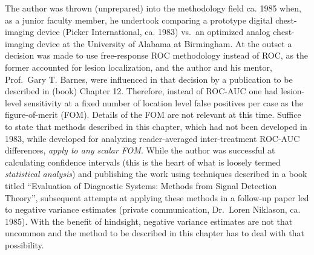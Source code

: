 \documentclass[
]{book}
\begin{document}
The author was thrown (unprepared) into the methodology field ca. 1985 when, as a junior faculty member, he undertook comparing a prototype digital chest-imaging device (Picker International, ca. 1983) vs.~an optimized analog chest-imaging device at the University of Alabama at Birmingham. At the outset a decision was made to use free-response ROC methodology instead of ROC, as the former accounted for lesion localization, and the author and his mentor, Prof.~Gary T. Barnes, were influenced in that decision by a publication \citep{RN2453} to be described in (book) Chapter 12. Therefore, instead of ROC-AUC one had lesion-level sensitivity at a fixed number of location level false positives per case as the figure-of-merit (FOM). Details of the FOM are not relevant at this time. Suffice to state that methods described in this chapter, which had not been developed in 1983, while developed for analyzing reader-averaged inter-treatment ROC-AUC differences, \emph{apply to any scalar FOM}. While the author was successful at calculating confidence intervals (this is the heart of what is loosely termed \emph{statistical analysis}) and publishing the work \citep{RN621} using techniques described in a book \citep{RN412} titled ``Evaluation of Diagnostic Systems: Methods from Signal Detection Theory'', subsequent attempts at applying these methods in a follow-up paper \citep{RN620} led to negative variance estimates (private communication, Dr.~Loren Niklason, ca. 1985). With the benefit of hindsight, negative variance estimates are not that uncommon and the method to be described in this chapter has to deal with that possibility.
\end{document}
